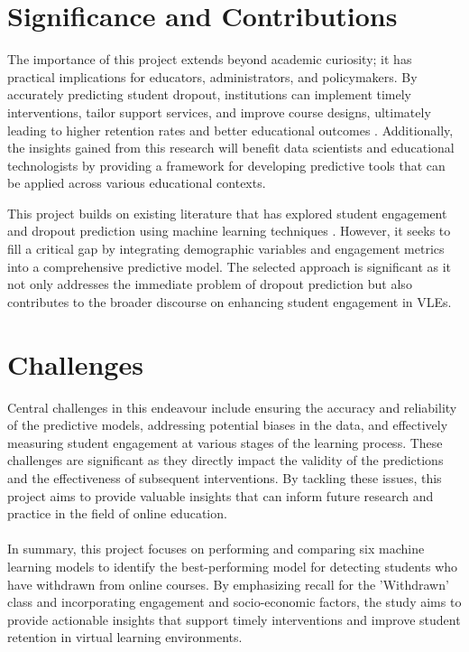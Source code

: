 \documentclass[ %
                    author={Carlos Duran Calle},
                supervisor={Dr. Felipe Campelo},
                    degree={MSc},
                     title={Comparative Machine Learning Analysis for Student Dropout Prediction in a Virtual Learning Environment},
                  subtitle={Incorporating Student Engagement and Socio-Economic Features},
                      type={},
                      year={2025}]{dissertation}
\begin{document}
\section{Significance and Contributions}
The importance of this project extends beyond academic curiosity; it has practical implications for educators, administrators, and policymakers. By accurately predicting student dropout, institutions can implement timely interventions, tailor support services, and improve course designs, ultimately leading to higher retention rates and better educational outcomes \cite{kahu_student_engagement_2013}. Additionally, the insights gained from this research will benefit data scientists and educational technologists by providing a framework for developing predictive tools that can be applied across various educational contexts.

This project builds on existing literature that has explored student engagement and dropout prediction using machine learning techniques \cite{tomasevic_comparison_supervised_data_2020, hussain_student_engagement_prediction_2018}. However, it seeks to fill a critical gap by integrating demographic variables and engagement metrics into a comprehensive predictive model. The selected approach is significant as it not only addresses the immediate problem of dropout prediction but also contributes to the broader discourse on enhancing student engagement in VLEs.

\section{Challenges}
Central challenges in this endeavour include ensuring the accuracy and reliability of the predictive models, addressing potential biases in the data, and effectively measuring student engagement at various stages of the learning process. These challenges are significant as they directly impact the validity of the predictions and the effectiveness of subsequent interventions. By tackling these issues, this project aims to provide valuable insights that can inform future research and practice in the field of online education.

\paragraph{}
In summary, this project focuses on performing and comparing six machine learning models to identify the best-performing model for detecting students who have withdrawn from online courses. By emphasizing recall for the 'Withdrawn' class and incorporating engagement and socio-economic factors, the study aims to provide actionable insights that support timely interventions and improve student retention in virtual learning environments. 
\end{document}
